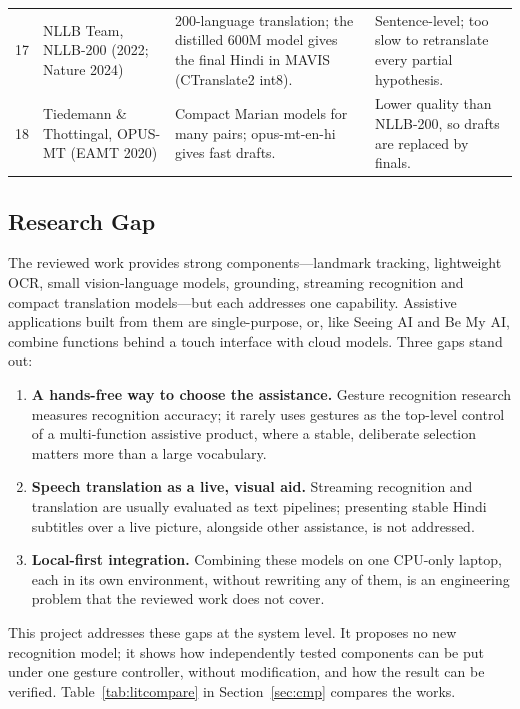 \documentclass[12pt,singleside,a4paper]{article}
\begin{document}
{\begin{longtable}{@{}p{0.4cm}p{3.6cm}p{6.0cm}p{5.2cm}@{}}
17 & NLLB Team, NLLB-200 (2022; Nature 2024) \cite{nllb2022} & 200-language translation; the distilled 600M model gives the final Hindi in MAVIS (CTranslate2 int8). & Sentence-level; too slow to retranslate every partial hypothesis. \\
18 & Tiedemann \& Thottingal, OPUS-MT (EAMT 2020) \cite{tiedemann2020} & Compact Marian models for many pairs; opus-mt-en-hi gives fast drafts. & Lower quality than NLLB-200, so drafts are replaced by finals. \\
\bottomrule
\end{longtable}
}

\subsection{Research Gap}
The reviewed work provides strong components---landmark tracking, lightweight OCR, small vision-language models, grounding, streaming recognition and compact translation models---but each addresses one capability. Assistive applications built from them are single-purpose, or, like Seeing AI and Be My AI, combine functions behind a touch interface with cloud models. Three gaps stand out:
\begin{enumerate}[leftmargin=*]
\item \textbf{A hands-free way to choose the assistance.} Gesture recognition research measures recognition accuracy; it rarely uses gestures as the top-level control of a multi-function assistive product, where a stable, deliberate selection matters more than a large vocabulary.
\item \textbf{Speech translation as a live, visual aid.} Streaming recognition and translation are usually evaluated as text pipelines; presenting stable Hindi subtitles over a live picture, alongside other assistance, is not addressed.
\item \textbf{Local-first integration.} Combining these models on one CPU-only laptop, each in its own environment, without rewriting any of them, is an engineering problem that the reviewed work does not cover.
\end{enumerate}
This project addresses these gaps at the system level. It proposes no new recognition model; it shows how independently tested components can be put under one gesture controller, without modification, and how the result can be verified. Table~\ref{tab:litcompare} in Section~\ref{sec:cmp} compares the works.

\pagebreak
\end{document}
